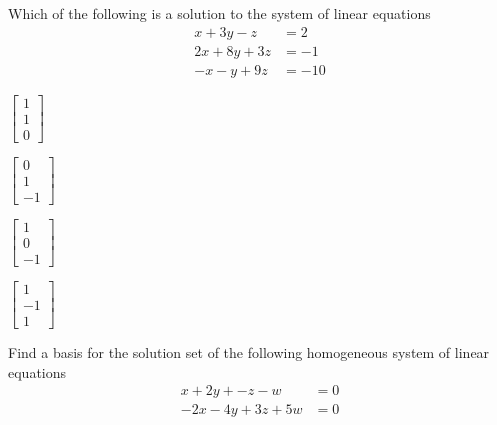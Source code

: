 \documentclass{article}[12pt]
\begin{document}
\begin{readinessAssuranceTest}

\item Which of the following is a solution to the system of linear equations
      \begin{align*}
      x+3y-z    &=   2 \\
      2x+8y+3z  &=  -1 \\
      -x-y+9z   &= -10
      \end{align*}

\begin{multicols}{4}
\begin{readinessAssuranceTestChoices}
\item $\begin{bmatrix} 1 \\ 1 \\ 0 \end{bmatrix}$
\item $\begin{bmatrix} 0 \\ 1 \\ -1 \end{bmatrix}$
\item $\begin{bmatrix} 1 \\ 0 \\ -1 \end{bmatrix}$
\item $\begin{bmatrix} 1 \\ -1 \\ 1 \end{bmatrix}$
\end{readinessAssuranceTestChoices}
\end{multicols}


\item Find a basis for the solution set of the following homogeneous system of
      linear equations
      \begin{align*}
      x+2y+-z-w    &= 0 \\
      -2x-4y+3z+5w &= 0
      \end{align*}


\end{readinessAssuranceTest}
\end{document}
